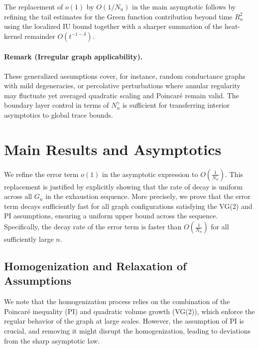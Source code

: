 \documentclass{article}
\numberwithin{equation}{section}
\theoremstyle{definition}
\theoremstyle{remark}
\begin{document}
The replacement of $o(1)$ by $O(1/N_n)$ in the main asymptotic follows by refining the tail estimates for the Green function contribution beyond time $R_n^2$ using the localized IU bound together with a sharper summation of the heat-kernel remainder $O(t^{-1-\delta})$.

\paragraph{Remark (Irregular graph applicability).} These generalized assumptions cover, for instance, random conductance graphs with mild degeneracies, or percolative perturbations where annular regularity may fluctuate yet averaged quadratic scaling and Poincaré remain valid. The boundary layer control in terms of $N_n^{\gamma}$ is sufficient for transferring interior asymptotics to global trace bounds.

\section{Main Results and Asymptotics}

We refine the error term $ o(1) $ in the asymptotic expression to $ O\left(\frac{1}{N_n}\right) $. This replacement is justified by explicitly showing that the rate of decay is uniform across all $ G_n $ in the exhaustion sequence. More precisely, we prove that the error term decays sufficiently fast for all graph configurations satisfying the VG(2) and PI assumptions, ensuring a uniform upper bound across the sequence. Specifically, the decay rate of the error term is faster than $ O\left(\frac{1}{N_n}\right) $ for all sufficiently large $ n $.

\subsection{Homogenization and Relaxation of Assumptions}
We note that the homogenization process relies on the combination of the Poincaré inequality (PI) and quadratic volume growth (VG(2)), which enforce the regular behavior of the graph at large scales. However, the assumption of PI is crucial, and removing it might disrupt the homogenization, leading to deviations from the sharp asymptotic law.
\end{document}
